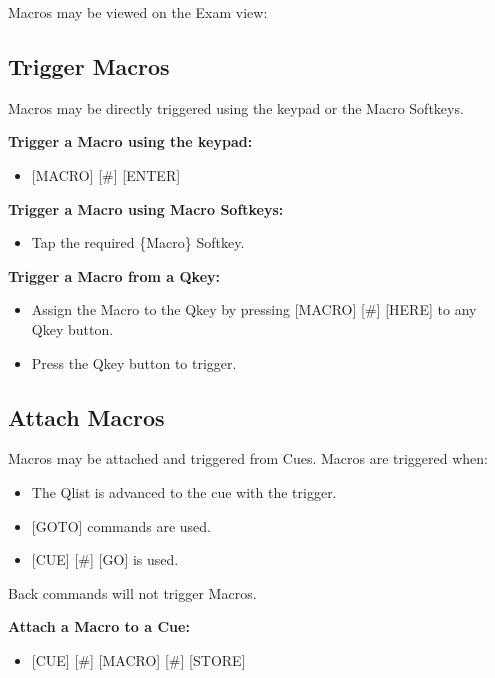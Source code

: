 \documentclass[
]{article}
\providecommand{\tightlist}{%
  \setlength{\itemsep}{0pt}\setlength{\parskip}{0pt}}
\begin{document}
Macros may be viewed on the Exam view:

\hypertarget{Trigger-Macros-13.2}{%
\subsection{Trigger Macros}\label{Trigger-Macros-13.2}}

Macros may be directly triggered using the keypad or the Macro Softkeys.

\textbf{Trigger a Macro using the keypad:}

\begin{itemize}
\tightlist
\item
  {[}MACRO{]} {[}\#{]} {[}ENTER{]}
\end{itemize}

\textbf{Trigger a Macro using Macro Softkeys:}

\begin{itemize}
\tightlist
\item
  Tap the required \{Macro\} Softkey.
\end{itemize}

\textbf{Trigger a Macro from a Qkey:}

\begin{itemize}
\item
  Assign the Macro to the Qkey by pressing {[}MACRO{]} {[}\#{]} {[}HERE{]} to any Qkey button.
\item
  Press the Qkey button to trigger.
\end{itemize}

\hypertarget{Attach-Macros-13.3}{%
\subsection{Attach Macros}\label{Attach-Macros-13.3}}

Macros may be attached and triggered from Cues.
Macros are triggered when:

\begin{itemize}
\item
  The Qlist is advanced to the cue with the trigger.
\item
  {[}GOTO{]} commands are used.
\item
  {[}CUE{]} {[}\#{]} {[}GO{]} is used.
\end{itemize}

{Back commands will not trigger Macros.}

\textbf{Attach a Macro to a Cue:}

\begin{itemize}
\tightlist
\item
  {[}CUE{]} {[}\#{]} {[}MACRO{]} {[}\#{]} {[}STORE{]}
\end{itemize}
\end{document}
